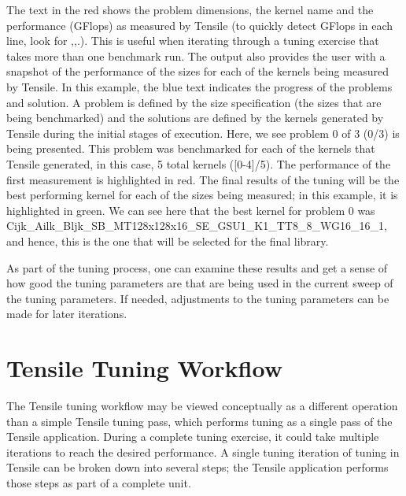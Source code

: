 \documentclass[]{article}
\begin{document}
\noindent
The text in the red shows the problem dimensions, the kernel name and the performance (GFlops) as measured by Tensile (to quickly detect GFlops in each line, look for ,,.). This is useful when iterating through a tuning exercise that takes more than one benchmark run. The output also provides the user with a snapshot of the performance of the sizes for each of the kernels being measured by Tensile. In this example, the blue text indicates the progress of the problems and solution. A problem is defined by the size specification (the sizes that are being benchmarked) and the solutions are defined by the kernels generated by Tensile during the initial stages of execution. Here, we see problem 0 of 3 (0/3) is being presented. This problem was benchmarked for each of the kernels that Tensile generated, in this case, 5 total kernels ([0-4]/5). The performance of the first measurement is highlighted in red. The final results of the tuning will be the best performing kernel for each of the sizes being measured; in this example, it is highlighted in green. We can see here that the best kernel for problem 0 was Cijk\_Ailk\_Bljk\_SB\_MT128x128x16\_SE\_GSU1\_K1\_TT8\_8\_WG16\_16\_1, and hence, this is the one that will be selected for the final library.

As part of the tuning process, one can examine these results and get a sense of how good the tuning parameters are that are being used in the current sweep of the tuning parameters. If needed, adjustments to the tuning parameters can be made for later iterations.

\section{Tensile Tuning Workflow}

The Tensile tuning workflow may be viewed conceptually as a different operation than a simple Tensile tuning pass, which performs tuning as a single pass of the Tensile application. During a complete tuning exercise, it could take multiple iterations to reach the desired performance. A single tuning iteration of tuning in Tensile can be broken down into several steps; the Tensile application performs those steps as part of a complete unit.
\end{document}
